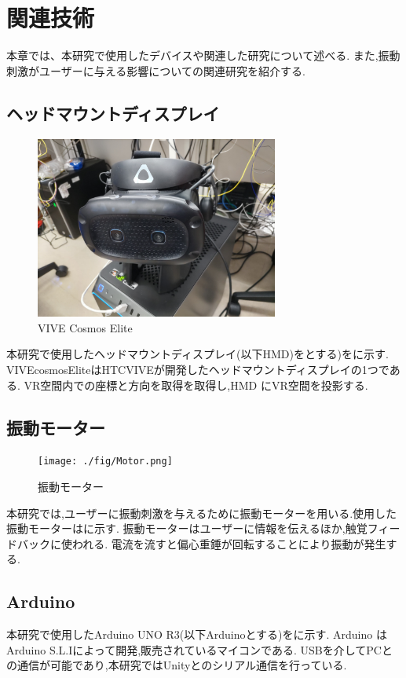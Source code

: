 \chapter{関連技術}

本章では、本研究で使用したデバイスや関連した研究について述べる.
また,振動刺激がユーザーに与える影響についての関連研究を紹介する.

\section{ヘッドマウントディスプレイ}

\begin{figure}[h]
\centering
\includegraphics[clip,width=8cm]{./fig/VIVE.png}
\caption{VIVE Cosmos Elite}\label{VIVE}
\end{figure}
本研究で使用したヘッドマウントディスプレイ(以下HMD)をとする)をに示す.
VIVEcosmosEliteはHTCVIVEが開発したヘッドマウントディスプレイの1つである.
VR空間内での座標と方向を取得を取得し,HMD にVR空間を投影する.




\newpage

\section{振動モーター}

\begin{figure}[h]
\centering
\texttt{[image: ./fig/Motor.png]}
\caption{振動モーター}\label{motor}
\end{figure}

本研究では,ユーザーに振動刺激を与えるために振動モーターを用いる.使用した振動モーターはに示す.
振動モーターはユーザーに情報を伝えるほか,触覚フィードバックに使われる.
電流を流すと偏心重錘が回転することにより振動が発生する.


\section{Arduino}
本研究で使用したArduino UNO R3\cite{arduino}(以下Arduinoとする)をに示す.
Arduino はArduino S.L.Iによって開発,販売されているマイコンである.
USBを介してPCとの通信が可能であり,本研究ではUnityとのシリアル通信を行っている.

